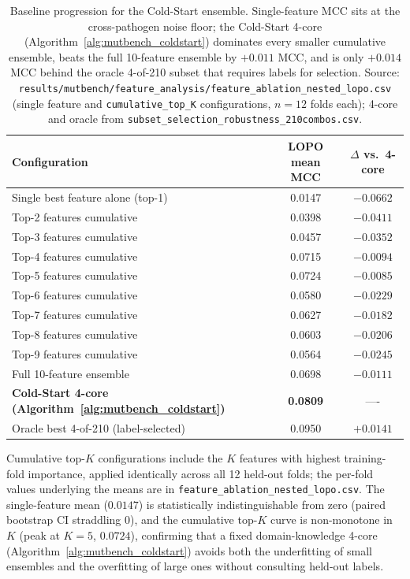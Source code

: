 \begin{table}[htbp]
\centering
\caption{Baseline progression for the Cold-Start ensemble. Single-feature MCC sits at the cross-pathogen noise floor; the Cold-Start 4-core (Algorithm~\ref{alg:mutbench_coldstart}) dominates every smaller cumulative ensemble, beats the full 10-feature ensemble by $+0.011$ MCC, and is only $+0.014$ MCC behind the oracle 4-of-210 subset that requires labels for selection. Source: \texttt{results/mutbench/feature\_analysis/feature\_ablation\_nested\_lopo.csv} (single feature and \texttt{cumulative\_top\_K} configurations, $n = 12$ folds each); 4-core and oracle from \texttt{subset\_selection\_robustness\_210combos.csv}.}
\label{tab:cold_start_baseline_progression}
\footnotesize
\begin{tabular}{lcc}
\toprule
\textbf{Configuration} & \textbf{LOPO mean MCC} & \textbf{$\Delta$ vs.\ 4-core} \\
\midrule
Single best feature alone (top-1)               & 0.0147 & $-0.0662$ \\
Top-2 features cumulative                       & 0.0398 & $-0.0411$ \\
Top-3 features cumulative                       & 0.0457 & $-0.0352$ \\
Top-4 features cumulative                       & 0.0715 & $-0.0094$ \\
Top-5 features cumulative                       & 0.0724 & $-0.0085$ \\
Top-6 features cumulative                       & 0.0580 & $-0.0229$ \\
Top-7 features cumulative                       & 0.0627 & $-0.0182$ \\
Top-8 features cumulative                       & 0.0603 & $-0.0206$ \\
Top-9 features cumulative                       & 0.0564 & $-0.0245$ \\
Full 10-feature ensemble                        & 0.0698 & $-0.0111$ \\
\midrule
\textbf{Cold-Start 4-core (Algorithm~\ref{alg:mutbench_coldstart})} & \textbf{0.0809} & ----     \\
\midrule
Oracle best 4-of-210 (label-selected)           & 0.0950 & $+0.0141$ \\
\bottomrule
\end{tabular}
\begin{minipage}{\textwidth}
\smallskip
\footnotesize Cumulative top-$K$ configurations include the $K$ features with highest training-fold importance, applied identically across all 12 held-out folds; the per-fold values underlying the means are in \texttt{feature\_ablation\_nested\_lopo.csv}. The single-feature mean ($0.0147$) is statistically indistinguishable from zero (paired bootstrap CI straddling 0), and the cumulative top-$K$ curve is non-monotone in $K$ (peak at $K{=}5$, $0.0724$), confirming that a fixed domain-knowledge 4-core (Algorithm~\ref{alg:mutbench_coldstart}) avoids both the underfitting of small ensembles and the overfitting of large ones without consulting held-out labels.
\end{minipage}
\end{table}

